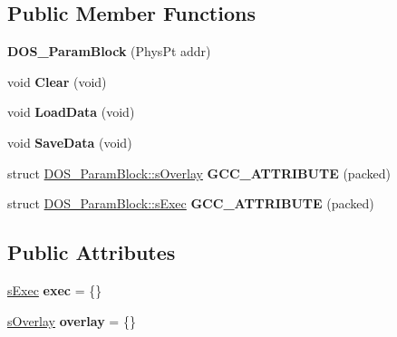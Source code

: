 \subsection*{Public Member Functions}
\begin{DoxyCompactItemize}
\item 
\hypertarget{classDOS__ParamBlock_af9c5e6e9379c3fcb24def7ba9c7af9de}{{\bfseries D\-O\-S\-\_\-\-Param\-Block} (Phys\-Pt addr)}\label{classDOS__ParamBlock_af9c5e6e9379c3fcb24def7ba9c7af9de}

\item 
\hypertarget{classDOS__ParamBlock_aa842f9a32d70301571b799a9da9f1b64}{void {\bfseries Clear} (void)}\label{classDOS__ParamBlock_aa842f9a32d70301571b799a9da9f1b64}

\item 
\hypertarget{classDOS__ParamBlock_a104d763715c0d58f6e94b088087f4f8b}{void {\bfseries Load\-Data} (void)}\label{classDOS__ParamBlock_a104d763715c0d58f6e94b088087f4f8b}

\item 
\hypertarget{classDOS__ParamBlock_a066b79588de8b72bad774b18912d4858}{void {\bfseries Save\-Data} (void)}\label{classDOS__ParamBlock_a066b79588de8b72bad774b18912d4858}

\item 
\hypertarget{classDOS__ParamBlock_afa64b22f01b5f982ce1782176b11bc22}{struct \hyperlink{structDOS__ParamBlock_1_1sOverlay}{D\-O\-S\-\_\-\-Param\-Block\-::s\-Overlay} {\bfseries G\-C\-C\-\_\-\-A\-T\-T\-R\-I\-B\-U\-T\-E} (packed)}\label{classDOS__ParamBlock_afa64b22f01b5f982ce1782176b11bc22}

\item 
\hypertarget{classDOS__ParamBlock_ab6a8cac7fa1aa818c069cf07e7857b44}{struct \hyperlink{structDOS__ParamBlock_1_1sExec}{D\-O\-S\-\_\-\-Param\-Block\-::s\-Exec} {\bfseries G\-C\-C\-\_\-\-A\-T\-T\-R\-I\-B\-U\-T\-E} (packed)}\label{classDOS__ParamBlock_ab6a8cac7fa1aa818c069cf07e7857b44}

\end{DoxyCompactItemize}
\subsection*{Public Attributes}
\begin{DoxyCompactItemize}
\item 
\hypertarget{classDOS__ParamBlock_a9ae3a22f1c1e051d73a4f312604975d0}{\hyperlink{structDOS__ParamBlock_1_1sExec}{s\-Exec} {\bfseries exec} = \{\}}\label{classDOS__ParamBlock_a9ae3a22f1c1e051d73a4f312604975d0}

\item 
\hypertarget{classDOS__ParamBlock_a51e2ef25f0ca8f9b9e8dc4bafce0a78b}{\hyperlink{structDOS__ParamBlock_1_1sOverlay}{s\-Overlay} {\bfseries overlay} = \{\}}\label{classDOS__ParamBlock_a51e2ef25f0ca8f9b9e8dc4bafce0a78b}

\end{DoxyCompactItemize}


